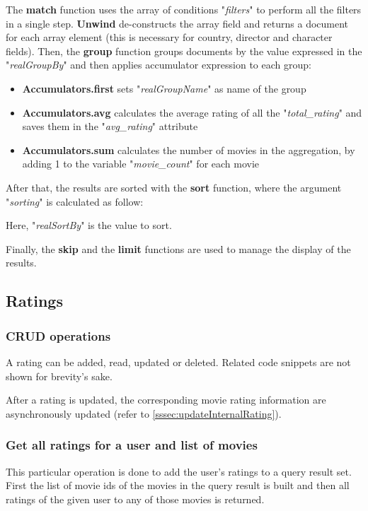 \documentclass[11pt]{article}
\begin{document}
The \textbf{match} function uses the array of conditions "\textit{filters}" to perform all the filters in a single step. \textbf{Unwind} de-constructs the array field and returns a document for each array element (this is necessary for country, director and character fields). Then, the \textbf{group} function groups documents by the value expressed in the "\textit{realGroupBy}" and then applies accumulator expression to each group:
\begin{itemize}
	\item \textbf{Accumulators.first} sets "\textit{realGroupName}" as name of the group
	\item \textbf{Accumulators.avg} calculates the average rating of all the "\textit{total\_rating}" and saves them in the "\textit{avg\_rating}" attribute
	\item \textbf{Accumulators.sum} calculates the number of movies in the aggregation, by adding 1 to the variable "\textit{movie\_count}" for each movie
\end{itemize}
After that, the results are sorted with the \textbf{sort} function, where the argument "\textit{sorting}" is calculated as follow:



Here, "\textit{realSortBy}" is the value to sort.

Finally, the \textbf{skip} and the \textbf{limit} functions are used to manage the display of the results.

\subsection{Ratings}
\subsubsection{CRUD operations}
A rating can be added, read, updated or deleted. Related code snippets are not shown for brevity's sake.

After a rating is updated, the corresponding movie rating information are asynchronously updated (refer to \ref{sssec:updateInternalRating}).

\subsubsection{Get all ratings for a user and list of movies}
\label{sssec:userratings}
This particular operation is done to add the user's ratings to a query result set. First the list of movie ids of the movies in the query result is built and then all ratings of the given user to any of those movies is returned.
\end{document}
